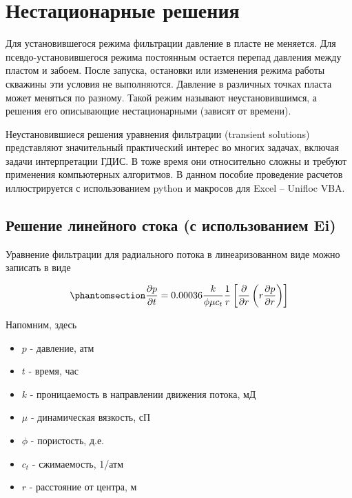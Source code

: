\documentclass[
  russian,
  letterpaper,
  DIV=11,
  numbers=noendperiod,
  oneside]{scrartcl}
\providecommand{\tightlist}{%
  \setlength{\itemsep}{0pt}\setlength{\parskip}{0pt}}
\begin{document}
\section{Нестационарные
решения}\label{ux43dux435ux441ux442ux430ux446ux438ux43eux43dux430ux440ux43dux44bux435-ux440ux435ux448ux435ux43dux438ux44f}

Для установившегося режима фильтрации давление в пласте не меняется. Для
псевдо-установившегося режима постоянным остается перепад давления между
пластом и забоем. После запуска, остановки или изменения режима работы
скважины эти условия не выполняются. Давление в различных точках пласта
может меняться по разному. Такой режим называют неустановившимся, а
решения его описывающие нестационарными (зависят от времени).

Неустановившиеся решения уравнения фильтрации (transient solutions)
представляют значительный практический интерес во многих задачах,
включая задачи интерпретации ГДИС. В тоже время они относительно сложны
и требуют применения компьютерных алгоритмов. В данном пособие
проведение расчетов иллюстрируется с использованием python и макросов
для Excel -- Unifloc VBA.

\subsection{Решение линейного стока (с использованием
Ei)}\label{ux440ux435ux448ux435ux43dux438ux435-ux43bux438ux43dux435ux439ux43dux43eux433ux43e-ux441ux442ux43eux43aux430-ux441-ux438ux441ux43fux43eux43bux44cux437ux43eux432ux430ux43dux438ux435ux43c-ei}

Уравнение фильтрации для радиального потока в линеаризованном виде можно
записать в виде

\begin{equation}\phantomsection\label{eq-diff_eq_solution}{ 
\frac{\partial p}{\partial t} = 0.00036 \dfrac{k}{\phi \mu c_t} \dfrac{1}{r} \left[ \dfrac{\partial}{\partial r} \left( r \dfrac{ \partial p} {\partial r} \right) \right]  
}\end{equation}

Напомним, здесь

\begin{itemize}
\tightlist
\item
  \(p\) - давление, атм
\item
  \(t\) - время, час
\item
  \(k\) - проницаемость в направлении движения потока, мД
\item
  \(\mu\) - динамическая вязкость, сП
\item
  \(\phi\) - пористость, д.е.
\item
  \(c_t\) - сжимаемость, 1/атм
\item
  \(r\) - расстояние от центра, м
\end{itemize}
\end{document}
